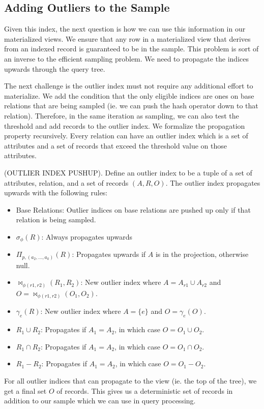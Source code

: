 \subsection{Adding Outliers to the Sample}
Given this index, the next question is how we can use this information in our materialized views.
We ensure that any row in a materialized view that derives from an indexed record is guaranteed to be in the sample.
This problem is sort of an inverse to the efficient sampling problem.
We need to propagate the indices upwards through the query tree.

The next challenge is the outlier index must not require any additional effort to materialize.
We add the condition that the only eligible indices are ones on base relations that are being sampled (ie. we can push the hash operator down to that relation).
Therefore, in the same iteration as sampling, we can also test the threshold and add records to the outlier index.
We formalize the propagation property recursively. 
Every relation can have an outlier index which is a set of attributes and a set of records that exceed the threshold value on those attributes.

\begin{definition}
(OUTLIER INDEX PUSHUP). Define an outlier index to be a tuple of a set of attributes, relation, and a set of records $(A,R,O)$. The outlier index propagates upwards with the following rules:
\begin{itemize}\vspace{-.45em}
\item Base Relations: Outlier indices on base relations are pushed up only if that relation is being sampled.\vspace{-.45em}
\item $\sigma_{\phi}(R)$: Always propagates upwards \vspace{-.45em}
\item $\Pi_{p,(a_2,...,a_k)}(R)$: Propagates upwards if $A$ is in the projection, otherwise null.\vspace{-.45em}
\item $\bowtie_{\phi (r1,r2)}(R_1,R_2)$: New outlier index where $A=A_{r1} \cup A_{r2}$ and $O = \bowtie_{\phi (r1,r2)}(O_1,O_2)$.
\item $\gamma_{e}(R)$: New outlier index where $A=\{e\}$ and $O = \gamma_{e}(O)$.\vspace{-.45em}
\item $R_1 \cup R_2$: Propagates if $A_1 = A_2$, in which case $O = O_1 \cup O_2$.
\item $R_1 \cap R_2$: Propagates if $A_1 = A_2$, in which case $O = O_1 \cap O_2$.
\item $R_1 - R_2$: Propagates if $A_1 = A_2$, in which case $O = O_1 - O_2$.
\end{itemize}
\end{definition}
For all outlier indices that can propagate to the view (ie. the top of the tree), we get a final set $O$ of records. 
This gives us a deterministic set of records in addition to our sample which we can use in query processing.

